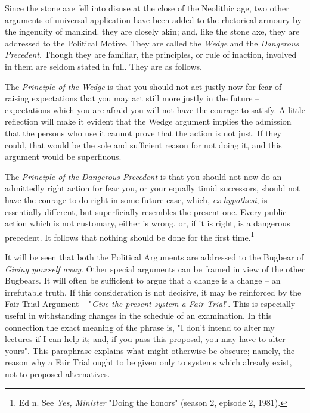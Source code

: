 \documentclass[12pt, oneside, b5paper]{memoir}
\begin{document}
Since the stone axe fell into disuse at the close of the Neolithic age, two other arguments of universal application have been added to the rhetorical armoury by the ingenuity of mankind. they are closely akin; and, like the stone axe, they are addressed to the Political Motive. They are called the \emph{Wedge} and the \emph{Dangerous Precedent}. Though they are familiar, the principles, or rule of inaction, involved in them are seldom stated in full. They are as follows.

The \emph{Principle of the Wedge} is that you should not act justly now for fear of raising expectations that you may act still more justly in the future -- expectations which you are afraid you will not have the courage to satisfy. A little reflection will make it evident that the Wedge argument implies the admission that the persons who use it cannot prove that the action is not just. If they could, that would be the sole and sufficient reason for not doing it, and this argument would be superfluous.

The \emph{Principle of the Dangerous Precedent} is that you should not now do an admittedly right action for fear you, or your equally timid successors, should not have the courage to do right in some future case, which, \emph{ex hypothesi}, is essentially different, but superficially resembles the present one. Every public action which is not customary, either is wrong, or, if it is right, is a dangerous precedent. It follows that nothing should be done for the first time.\footnote{Ed n. See \emph{Yes, Minister} "Doing the honors" (season 2, episode 2, 1981).}

It will be seen that both the Political Arguments are addressed to the Bugbear of \emph{Giving yourself away}. Other special arguments can be framed in view of the other Bugbears. It will often be sufficient to argue that a change is a change -- an irrefutable truth. If this consideration is not decisive, it may be reinforced by the Fair Trial Argument -- "\emph{Give the present system a Fair Trial}". This is especially useful in withstanding changes in the schedule of an examination. In this connection the exact meaning of the phrase is, "I don't intend to alter my lectures if I can help it; and, if you pass this proposal, you may have to alter yours". This paraphrase explains what might otherwise be obscure; namely, the reason why a Fair Trial ought to be given only to systems which already exist, not to proposed alternatives.
\end{document}
